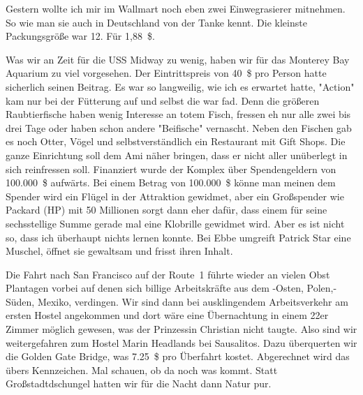 Gestern wollte ich mir im Wallmart noch eben zwei Einwegrasierer mitnehmen.
So wie man sie auch in Deutschland von der Tanke kennt.
Die kleinste Packungsgröße war 12.
Für 1,88~\$.

Was wir an Zeit für die USS Midway zu wenig, haben wir für das Monterey Bay Aquarium zu viel vorgesehen.
Der Eintrittspreis von 40~\$ pro Person hatte sicherlich seinen Beitrag.
Es war so langweilig, wie ich es erwartet hatte,
"Action" kam nur bei der Fütterung auf und selbst die war fad.
Denn die größeren Raubtierfische haben wenig Interesse an totem Fisch, fressen eh nur alle zwei bis drei Tage oder haben schon andere "Beifische" vernascht.
Neben den Fischen gab es noch Otter, Vögel und selbstverständlich ein Restaurant mit Gift Shops.
Die ganze Einrichtung soll dem Ami näher bringen, dass er nicht aller unüberlegt in sich reinfressen soll.
Finanziert wurde der Komplex über Spendengeldern von 100.000~\$ aufwärts.
Bei einem Betrag von 100.000~\$ könne man meinen dem Spender wird ein Flügel in der Attraktion gewidmet, aber ein Großspender wie Packard (HP) mit 50 Millionen sorgt dann eher dafür, dass einem für seine sechsstellige Summe gerade mal eine Klobrille gewidmet wird.
Aber es ist nicht so, dass ich überhaupt nichts lernen konnte.
Bei Ebbe umgreift Patrick Star eine Muschel, öffnet sie gewaltsam und frisst ihren Inhalt.

Die Fahrt nach San Francisco auf der Route~1 führte wieder an vielen Obst Plantagen vorbei auf denen sich billige Arbeitskräfte aus dem -Osten, Polen,- Süden, Mexiko, verdingen.
Wir sind dann bei ausklingendem Arbeitsverkehr am ersten Hostel angekommen und dort wäre eine Übernachtung in einem 22er Zimmer möglich gewesen, was der Prinzessin Christian nicht taugte.
Also sind wir weitergefahren zum Hostel Marin Headlands bei Sausalitos.
Dazu überquerten wir die Golden Gate Bridge, was 7.25~\$ pro Überfahrt kostet.
Abgerechnet wird das übers Kennzeichen.
Mal schauen, ob da noch was kommt.
Statt Großstadtdschungel hatten wir für die Nacht dann Natur pur.